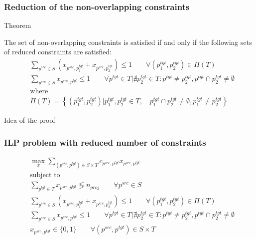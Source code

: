 \documentclass{beamer}
\newcommand{\src}[1]{#1^{src}}
\newcommand{\tgt}[1]{#1^{tgt}}
\begin{document}
\begin{frame}
  \frametitle{Reduction of the non-overlapping constraints}

  \begin{block}{Theorem}

    The set of non-overlapping constraints is satisfied if and only if
    the following sets of reduced constraints are satisfied:
    \begin{align*}
      & \sum\limits_{\src{p} \in S} (x_{\src{p}, \tgt{p_1}} + x_{\src{p}, \tgt{p_2}}) \leq 1
      \qquad \forall (\tgt{p_1}, \tgt{p_2}) \in \Pi(T) \\
      & \sum\limits_{\src{p} \in S} x_{\src{p}, \tgt{p}} \leq 1
      \qquad \forall \tgt{p} \in T \Big| \nexists \tgt{p_2} \in T: \tgt{p} \neq \tgt{p_2}, \tgt{p} \cap \tgt{p_2} \neq \emptyset                                             \\
      & \text{where} \\
      & \Pi(T) = \left\{ (\tgt{p_1}, \tgt{p_2}) \Big| \tgt{p_1}, \tgt{p_2} \in T,
        \quad \tgt{p_1} \cap \tgt{p_2} \neq \emptyset,
      \tgt{p_1} \neq \tgt{p_2} \right\}
    \end{align*}
  \end{block}

  \begin{exampleblock}{Idea of the proof}

  \end{exampleblock}
\end{frame}

\begin{frame}
  \frametitle{ILP problem with reduced number of constraints}

  \begin{align*}
    & \max\limits_x \sum\limits_{(\src{p}, \tgt{p}) \in S \times T} c_{\src{p}, \tgt{p}} x_{\src{p}, \tgt{p}}                                                                                                                       \\
    & \text{subject to}                                                                                                                                                                                                             \\
    & \sum\limits_{\tgt{p} \in T} x_{\src{p}, \tgt{p}} \lessgtr n_{proj}
    \qquad \forall \src{p} \in S                                                                                               \\
    & \sum\limits_{\src{p} \in S} (x_{\src{p}, \tgt{p_1}} + x_{\src{p}, \tgt{p_2}}) \leq 1
    \qquad \forall (\tgt{p_1}, \tgt{p_2}) \in \Pi(T)                                                                           \\
    & \sum\limits_{\src{p} \in S} x_{\src{p}, \tgt{p}} \leq 1
    \qquad \forall \tgt{p} \in T \Big| \nexists \tgt{p_2} \in T: \tgt{p} \neq \tgt{p_2}, \tgt{p} \cap \tgt{p_2} \neq \emptyset \\
    & x_{\src{p}, \tgt{p}} \in \{ 0, 1 \}
    \qquad \forall (\src{p}, \tgt{p}) \in S \times T
  \end{align*}
\end{frame}
\end{document}
